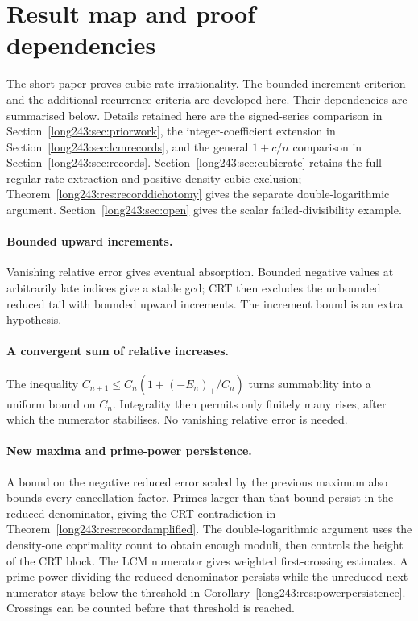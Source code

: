 \documentclass[11pt]{article}
\begin{document}
\section{Result map and proof dependencies}\label{sec:erdos-243-complete-family-map}
The short paper proves cubic-rate irrationality. The bounded-increment
criterion and the additional recurrence criteria are developed here. Their dependencies are
summarised below. Details retained here are the signed-series
comparison in Section~\ref{long243:sec:priorwork}, the integer-coefficient
extension in Section~\ref{long243:sec:lcmrecords}, and the general
$1+c/n$ comparison in Section~\ref{long243:sec:records}.
Section~\ref{long243:sec:cubicrate} retains the full regular-rate
extraction and positive-density cubic exclusion;
Theorem~\ref{long243:res:recorddichotomy} gives the separate
double-logarithmic argument. Section~\ref{long243:sec:open} gives the scalar failed-divisibility example.

\paragraph{Bounded upward increments.}
Vanishing relative error gives eventual absorption. Bounded negative
values at arbitrarily late indices give a stable gcd; CRT then excludes
the unbounded reduced tail with bounded upward increments. The increment
bound is an extra hypothesis.

\paragraph{A convergent sum of relative increases.}
The inequality $C_{n+1}\le C_n(1+(-E_n)_+/C_n)$ turns summability into a
uniform bound on $C_n$. Integrality then permits only finitely many rises,
after which the numerator stabilises.
No vanishing relative error is needed.

\paragraph{New maxima and prime-power persistence.}
A bound on the negative reduced error scaled by the previous maximum
also bounds every cancellation factor. Primes larger than that bound
persist in the reduced denominator, giving the CRT contradiction in
Theorem~\ref{long243:res:recordamplified}. The double-logarithmic argument
uses the density-one coprimality count to obtain enough moduli, then
controls the height of the CRT block.
The LCM numerator gives weighted first-crossing estimates. A prime power
dividing the reduced denominator persists while the unreduced next
numerator stays below the threshold in
Corollary~\ref{long243:res:powerpersistence}. Crossings can be counted
before that threshold is reached.
\end{document}
